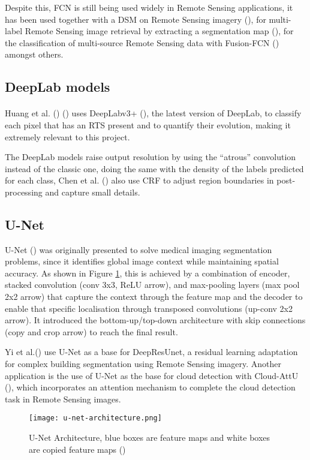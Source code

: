 Despite this, \gls{FCN} is still being used widely in Remote Sensing applications, it has been used together with a \gls{DSM} on Remote Sensing imagery (\cite{8281008}), for multi-label Remote Sensing image retrieval by extracting a segmentation map (\cite{8954885}), for the classification of multi-source Remote Sensing data with Fusion-\gls{FCN} (\cite{8518295}) amongst others.

\subsection{DeepLab models}
\paragraph{}
Huang et al. (\cite{HUANG2020111534}) (\cite{HUANG2021102399}) uses DeepLabv3+ (\cite{Chen_2018_ECCV}), the latest version of DeepLab, to classify each pixel that has an \gls{RTS} present and to quantify their evolution, making it extremely relevant to this project.

The DeepLab models raise output resolution by using the “atrous” convolution instead of the classic one, doing the same with the density of the labels predicted for each class, Chen et al. (\cite{chen2017deeplab}) also use \gls{CRF} to adjust region boundaries in post-processing and capture small details.

\subsection{U-Net}
U-Net (\cite{ronneberger2015unet}) was originally presented to solve medical imaging segmentation problems, since it identifies global image context while maintaining spatial accuracy. As shown in Figure \ref{fig_unet}, this is achieved by a combination of encoder, stacked convolution (conv 3x3, \gls{ReLU} arrow), and max-pooling layers (max pool 2x2 arrow) that capture the context through the feature map and the decoder to enable that specific localisation through transposed convolutions (up-conv 2x2 arrow). It introduced the bottom-up/top-down architecture with skip connections (copy and crop arrow) to reach the final result.

Yi et al.(\cite{rs11151774}) use U-Net as a base for DeepResUnet, a residual learning adaptation for complex building segmentation using Remote Sensing imagery. Another application is the use of U-Net as the base for cloud detection with Cloud-AttU (\cite{sym12061056}), which incorporates an attention mechanism to complete the cloud detection task in Remote Sensing images.

    \begin{figure}[hbt!]
        \centering
        \texttt{[image: u-net-architecture.png]}
        \caption{U-Net Architecture, blue boxes are feature maps and white boxes are copied feature maps (\cite{ronneberger2015unet})}
        \label{fig_unet}
    \end{figure}